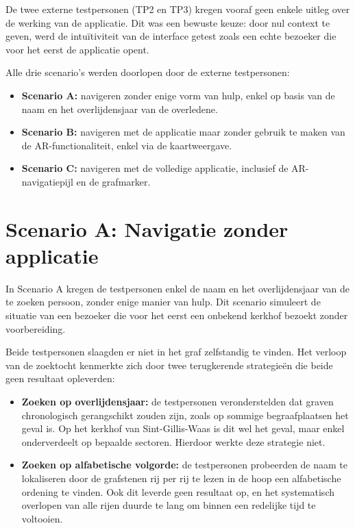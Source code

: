 De twee externe testpersonen (TP2 en TP3) kregen vooraf geen enkele uitleg over
de werking van de applicatie. Dit was een bewuste keuze: door nul context te
geven, werd de intuïtiviteit van de interface getest zoals een echte bezoeker
die voor het eerst de applicatie opent.

Alle drie scenario's werden doorlopen door de externe testpersonen:

\begin{itemize}
    \item \textbf{Scenario A:} navigeren zonder enige vorm van hulp, enkel op
    basis van de naam en het overlijdensjaar van de overledene.
    \item \textbf{Scenario B:} navigeren met de applicatie maar zonder gebruik
    te maken van de AR-functionaliteit, enkel via de kaartweergave.
    \item \textbf{Scenario C:} navigeren met de volledige applicatie, inclusief
    de AR-navigatiepijl en de grafmarker.
\end{itemize}

\section{Scenario A: Navigatie zonder applicatie}

In Scenario A kregen de testpersonen enkel de naam en het overlijdensjaar van
de te zoeken persoon, zonder enige manier van hulp. Dit scenario
simuleert de situatie van een bezoeker die voor het eerst een onbekend kerkhof
bezoekt zonder voorbereiding.

Beide testpersonen slaagden er niet in het graf zelfstandig te vinden. Het
verloop van de zoektocht kenmerkte zich door twee terugkerende strategieën die
beide geen resultaat opleverden:

\begin{itemize}
    \item \textbf{Zoeken op overlijdensjaar:} de testpersonen veronderstelden
    dat graven chronologisch gerangschikt zouden zijn, zoals op sommige
    begraafplaatsen het geval is. Op het kerkhof van Sint-Gillis-Waas is dit
    wel het geval, maar enkel onderverdeelt op bepaalde sectoren. Hierdoor werkte deze strategie niet.
    \item \textbf{Zoeken op alfabetische volgorde:} de testpersonen probeerden
    de naam te lokaliseren door de grafstenen rij per rij te lezen in de hoop
    een alfabetische ordening te vinden. Ook dit leverde geen resultaat op,
    en het systematisch overlopen van alle rijen duurde te lang om binnen een
    redelijke tijd te voltooien.
\end{itemize}

